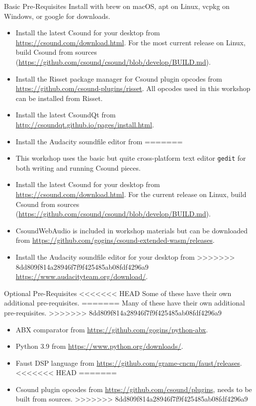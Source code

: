 \documentclass{beamer}
\begin{document}
    \begin{frame}{Basic Pre-Requisites}
    	Install with brew on macOS, apt on Linux, vcpkg on Windows, or 
	google for downloads.
        \begin{itemize}
<<<<<<< HEAD
            \item Install the latest Csound for your desktop from
            \url{https://csound.com/download.html}. For the most current release on
            Linux, build Csound from sources
            (\url{https://github.com/csound/csound/blob/develop/BUILD.md}).
            \item Install the Risset package manager for Csound plugin opcodes from 
            \url{https://github.com/csound-plugins/risset}. All opcodes used in this 
            workshop can be installed from Risset.
            \item Install the latest CsoundQt from
            \url{http://csoundqt.github.io/pages/install.html}.
            \item Install the Audacity soundfile editor from
=======
            \item This workshop uses the basic but quite cross-platform text editor \texttt{gedit} 
            for both writing and running Csound pieces.
            \item Install the latest Csound for your desktop from
            \url{https://csound.com/download.html}. For the current release on
            Linux, build Csound from sources 
            (\url{https://github.com/csound/csound/blob/develop/BUILD.md}).
            \item CsoundWebAudio is included in workshop materials but can be 
            downloaded from \url{https://github.com/gogins/csound-extended-wasm/releases}.
            \item Install the Audacity soundfile editor for your desktop from
>>>>>>> 8dd809f814a28946f7f9f425485ab08fdf4296a9
            \url{https://www.audacityteam.org/download/}.
        \end{itemize}
    \end{frame}
    
    \begin{frame}{Optional Pre-Requisites}
<<<<<<< HEAD
        Some of these have their own additional pre-requisites.
=======
        Many of these have their own additional pre-requisites. 
>>>>>>> 8dd809f814a28946f7f9f425485ab08fdf4296a9
        \begin{itemize}
            \item ABX comparator from \url{https://github.com/gogins/python-abx}.
            \item Python 3.9 from \url{https://www.python.org/downloads/}.
            \item Faust DSP language from
            \url{https://github.com/grame-cncm/faust/releases}.
<<<<<<< HEAD
=======
            \item Csound plugin opcodes from
            \url{https://github.com/csound/plugins}, needs to be built from sources.
>>>>>>> 8dd809f814a28946f7f9f425485ab08fdf4296a9
        \end{itemize}
    \end{frame}
    
\end{document}
